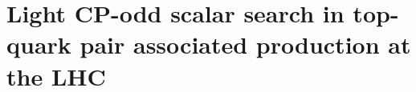 \chapter[Light CP-odd scalar search in top-quark pair associated production at the LHC]{Light CP-odd scalar search in top-quark pair associated production at the LHC}
\label{App:AppendixA}

\minitoc





